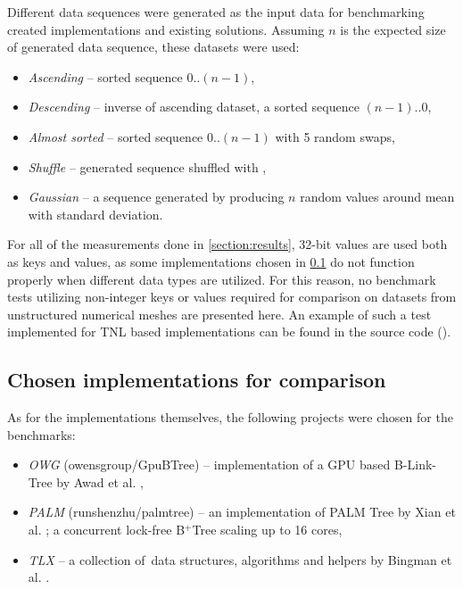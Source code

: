 Different data sequences were generated as the input data for benchmarking created implementations and existing solutions. Assuming $n$ is the expected size of generated data sequence, these datasets were used:

\begin{itemize}
  \item \textit{Ascending} -- sorted sequence $0..(n-1)$,
  \item \textit{Descending} -- inverse of ascending dataset, a sorted sequence $(n-1)..0$,
  \item \textit{Almost sorted} -- sorted sequence $0..(n-1)$ with 5 random swaps,
  \item \textit{Shuffle} -- generated sequence shuffled with ,
  \item \textit{Gaussian} -- a sequence generated by producing $n$ random values around mean with standard deviation.
\end{itemize}

For all of the measurements done in \cref{section:results}, 32-bit values are used both as keys and values, as some implementations chosen in \cref{subsection:benchmark:implementations} do not function properly when different data types are utilized. For this reason, no benchmark tests utilizing non-integer keys or values required for comparison on datasets from unstructured numerical meshes are presented here. An example of such a test implemented for TNL based implementations can be found in the source code ().

\subsection{Chosen implementations for comparison}\label{subsection:benchmark:implementations}

As for the implementations themselves, the following projects were chosen for the benchmarks:

\begin{itemize}
  \item \textit{OWG} (owensgroup/GpuBTree) -- implementation of a GPU based B-Link-Tree by Awad et al. \cite{awad},
  \item \textit{PALM} (runshenzhu/palmtree) -- an implementation of PALM Tree \cite{palm} by Xian et al. \cite{palm-impl}; a concurrent lock-free B$^+$Tree scaling up to 16 cores,
  \item \textit{TLX} -- a collection of \CC\,data structures, algorithms and helpers by Bingman et al. \cite{TLX}.
\end{itemize}

